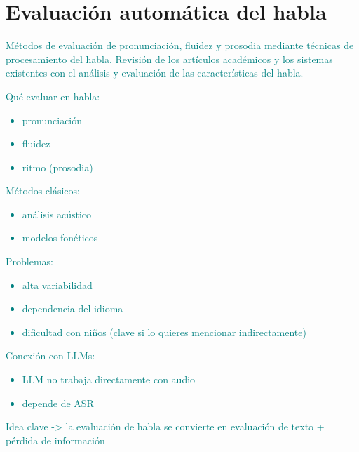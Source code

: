 \section{Evaluación automática del habla}
\textcolor{teal}{Métodos de evaluación de pronunciación, fluidez y prosodia mediante técnicas de procesamiento del habla. Revisión de los artículos académicos y los sistemas existentes con el análisis y evaluación de las características del habla.}
\textcolor{teal}{
    Qué evaluar en habla:
    \begin{itemize}
        \item pronunciación
        \item fluidez
        \item ritmo (prosodia)
    \end{itemize}
    Métodos clásicos:
    \begin{itemize}
        \item análisis acústico
        \item modelos fonéticos
    \end{itemize}
    Problemas:
    \begin{itemize}
        \item alta variabilidad
        \item dependencia del idioma
        \item dificultad con niños (clave si lo quieres mencionar indirectamente)
    \end{itemize}
    Conexión con LLMs:
    \begin{itemize}
        \item LLM no trabaja directamente con audio
        \item depende de ASR
    \end{itemize}
    Idea clave -> la evaluación de habla se convierte en evaluación de texto + pérdida de información
}
